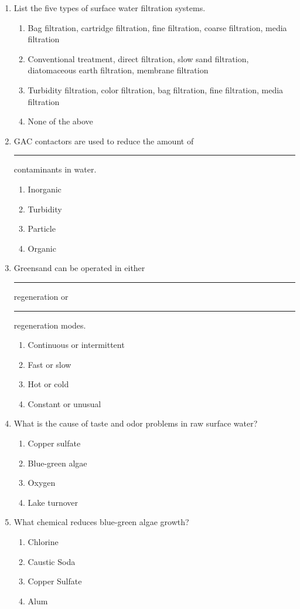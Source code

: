 \begin{enumerate}
\item List the five types of surface water filtration systems.
\begin{enumerate}
\item Bag filtration, cartridge filtration, fine filtration, coarse filtration, media filtration
\item Conventional treatment, direct filtration, slow sand filtration, diatomaceous
earth filtration, membrane filtration
\item Turbidity filtration, color filtration, bag filtration, fine filtration, media filtration
\item None of the above
\end{enumerate}

\item GAC contactors are used to reduce the amount of \rule{1cm}{0.5pt}  contaminants in water.
\begin{enumerate}
\item Inorganic
\item Turbidity
\item Particle
\item Organic
\end{enumerate}

\item Greensand can be operated in either \rule{1cm}{0.5pt}  regeneration or \rule{1cm}{0.5pt} regeneration modes.
\begin{enumerate}
\item Continuous or intermittent
\item Fast or slow
\item Hot or cold
\item Constant or unusual
\end{enumerate}

\item  What is the cause of taste and odor problems in raw surface water?\\
\begin{enumerate}
\item Copper sulfate\\
\item Blue-green algae\\
\item Oxygen\\
\item Lake turnover
\end{enumerate}

\item  What chemical reduces blue-green algae growth?\\
\begin{enumerate}
\item Chlorine\\
\item Caustic Soda\\
\item Copper Sulfate\\
\item Alum
\end{enumerate}



\end{enumerate}

